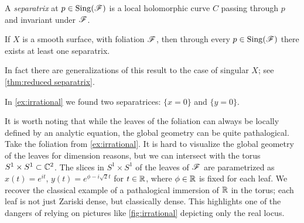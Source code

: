 \begin{definition}
    A \emph{separatrix} at $p\in\operatorname{Sing}(\mathscr{F})$ is a local holomorphic curve $C$
    passing through $p$ and invariant under $\mathscr{F}$.
\end{definition}

\begin{theorem}\label{thm:separatrix}
    If $X$ is a smooth surface, with foliation $\mathscr{F}$, then through every
    $p\in\operatorname{Sing}(\mathscr{F})$ there exists at least one separatrix.
\end{theorem}

In fact there are generalizations of this result to the case of singular $X$;
see \cref{thm:reduced separatrix}.

\begin{example}
    In \cref{ex:irrational} we found two separatrices: $\{x=0\}$ and
    $\{y=0\}$.
\end{example}

It is worth noting that while the leaves of the foliation can always be locally
defined by an analytic equation, the global geometry can be quite pathalogical.
Take the foliation from \cref{ex:irrational}. It is hard to visualize the global
geometry of the leaves for dimension reasons, but we can intersect with the
torus $S^1\times S^1\subset\mathbb{C}^2$. The slices in $S^1\times S^1$ of the leaves of
$\mathscr{F}$ are parametrized as $x(t)=e^{it}$, $y(t)=e^{\phi-i\sqrt2t}$ for
$t\in\mathbb{R}$, where $\phi\in\mathbb{R}$ is fixed for each leaf. We recover the classical
example of a pathalogical immersion of $\mathbb{R}$ in the torus; each leaf is not just
Zariski dense, but classically dense. This highlights one of the dangers of
relying on pictures like \cref{fig:irrational} depicting only the real locus.

